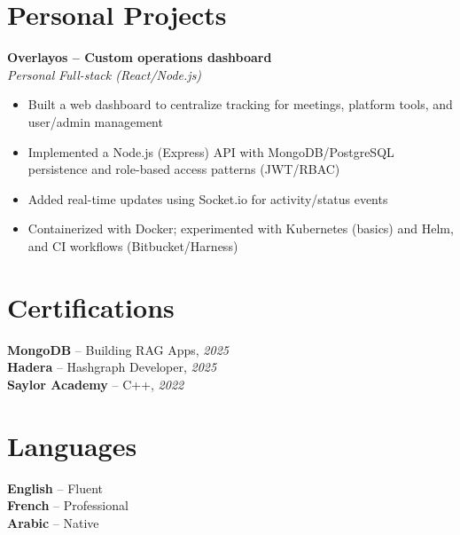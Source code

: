\documentclass[10pt,a4paper]{article}
\begin{document}
\vspace{4pt}
\section*{Personal Projects}
{\small
\textbf{Overlayos -- Custom operations dashboard}\\[1pt]
\textit{Personal} \hfill \textit{Full-stack (React/Node.js)}
\begin{itemize}
  \item Built a web dashboard to centralize tracking for meetings, platform tools, and user/admin management
  \item Implemented a Node.js (Express) API with MongoDB/PostgreSQL persistence and role-based access patterns (JWT/RBAC)
  \item Added real-time updates using Socket.io for activity/status events
  \item Containerized with Docker; experimented with Kubernetes (basics) and Helm, and CI workflows (Bitbucket/Harness)
\end{itemize}

}

\vspace{3pt}
\section*{Certifications}
{\small
\textbf{MongoDB} -- Building RAG Apps, \textit{2025}\\[1pt]
\textbf{Hadera} -- Hashgraph Developer, \textit{2025}\\[1pt]
\textbf{Saylor Academy} -- C++, \textit{2022}
}

\section*{Languages}
{\small
\textbf{English} -- Fluent\\[1pt]
\textbf{French} -- Professional\\[1pt]
\textbf{Arabic} -- Native
}
\end{document}
